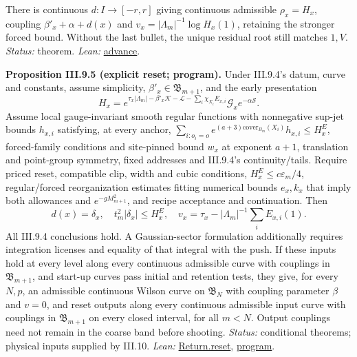 \documentclass[
  letterpaper,
  11pt]{article}
\begin{document}
There is continuous \(d:I\to[-r,r]\) giving continuous admissible
\(\rho_x=H_x\), coupling \(\beta'_x+\alpha+d(x)\) and
\(v_x=|\Lambda_m|^{-1}\log H_x(1)\), retaining the stronger forced
bound. Without the last bullet, the unique residual root still matches
\(1,V\). \emph{Status:} theorem. \emph{Lean:}
\href{https://github.com/yang-mills-group/OpenAI-YM-20261028/blob/3456e5e75cf8d4cd558955a5c7638fba2d68f464/YM/UVNext/COUPLING_RESET/Advance.lean\#L175-L189}{advance}.

\textbf{Proposition III.9.5 (explicit reset; program).} Under III.9.4's
datum, curve and constants, assume simplicity,
\(\beta'_x\in\mathfrak B_{m+1}\), and the early presentation
\[H_x=e^{\tau_x|\Lambda_m|-\beta'_x\mathcal K-\mathcal L-\sum_i\chi_{X_i}E_{x,i}}\mathcal G_xe^{-\alpha\mathcal S}.\]
Assume local gauge-invariant smooth regular functions with nonnegative
sup-jet bounds \(h_{x,i}\) satisfying, at every anchor,
\(\sum_{i:o_i=o}e^{(a+3)\mathrm{cover}_{B_m}(X_i)}h_{x,i}\le H_x^E\),
forced-family conditions and site-pinned bound \(w_x\) at exponent
\(a+1\), translation and point-group symmetry, fixed addresses and
III.9.4's continuity/tails. Require priced reset, compatible clip, width
and cubic conditions, \(H_x^E\le c\varepsilon_m/4\), regular/forced
reorganization estimates fitting numerical bounds \(e_x,k_x\) that imply
both allowances and \(e^{-gM_{m+1}^2}\), and recipe acceptance and
continuation. Then
\[d(x)=\delta_x,\quad t_m^2|\delta_x|\le H_x^E,\quad v_x=\tau_x-|\Lambda_m|^{-1}\sum_iE_{x,i}(1).\]
All III.9.4 conclusions hold. A Gaussian-sector formulation additionally
requires integration licenses and equality of that integral with the
push. If these inputs hold at every level along every continuous
admissible curve with couplings in \(\mathfrak B_{m+1}\), and start-up
curves pass initial and retention tests, they give, for every \(N,p\),
an admissible continuous Wilson curve on \(\mathfrak B_N\) with coupling
parameter \(\beta\) and \(v=0\), and reset outputs along every
continuous admissible input curve with couplings in
\(\mathfrak B_{m+1}\) on every closed interval, for all \(m<N\). Output
couplings need not remain in the coarse band before shooting.
\emph{Status:} conditional theorems; physical inputs supplied by III.10.
\emph{Lean:}
\href{https://github.com/yang-mills-group/OpenAI-YM-20261028/blob/3456e5e75cf8d4cd558955a5c7638fba2d68f464/YM/AnalyticBridge/VERIFIED_RESET_STEP/Advance.lean\#L64-L90}{Return.reset},
\href{https://github.com/yang-mills-group/OpenAI-YM-20261028/blob/3456e5e75cf8d4cd558955a5c7638fba2d68f464/YM/UVNext/COUPLING_RESET/Stability.lean\#L67-L70}{program}.
\end{document}
